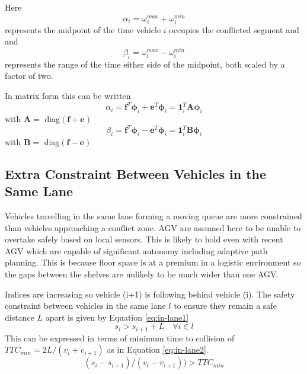 Here
\begin{equation}
	\alpha_i = \omega_i^{max} + \omega_i^{min}
\end{equation}
represents the midpoint of the time vehicle $i$ occupies the conflicted segment and and
\begin{equation}
	\beta_i = \omega_i^{max} - \omega_i^{min}
\end{equation}
represents the range of the time either side of the midpoint, both scaled by a factor of two.

In matrix form this can be written
\begin{equation}
	\label{eq:alpha_mat}
	\alpha_i = \bm{f}^T\bm{\phi}_i + \bm{e}^T\bm{\phi}_i = \bm{1}_i^T\bm{A}\bm{\phi}_i
\end{equation}
with $\bm{A}= $ diag$(\bm{f} + \bm{e})$
\begin{equation}
	\label{eq:beta_mat}
	\beta_i = \bm{f}^T\bm{\phi}_i - \bm{e}^T\bm{\phi}_i = \bm{1}_i^T\bm{B}\bm{\phi}_i
\end{equation}
with $\bm{B}= $ diag$(\bm{f} - \bm{e})$

\subsection{Extra Constraint Between Vehicles in the Same Lane}
Vehicles travelling in the same lane forming a moving queue are more constrained than vehicles approaching a conflict zone. AGV are assumed here to be unable to overtake safely based on local sensors. This is likely to hold even with recent AGV which are capable of significant autonomy including adaptive path planning. This is because floor space is at a premium in a logistic environment so the gaps between the shelves are unlikely to be much wider than one AGV.

Indices are increasing so vehicle (i+1) is following behind vehicle (i). The safety constraint between vehicles in the same lane $l$ to ensure they remain a safe distance $L$ apart is given by Equation \ref{eq:in-lane1}
\begin{equation}
	s_{i} > s_{i+1} + L \quad \forall i \in l
	\label{eq:in-lane1}
\end{equation}
This can be expressed in terms of minimum time to collision of $TTC_{min} = 2 L/(v_i + v_{i+1})$ as in Equation \ref{eq:in-lane2}.
\begin{equation}
	(s_{i}-s_{i+1})/(v_i - v_{i+1})) > TTC_{min}
	\label{eq:in-lane2}
\end{equation}

